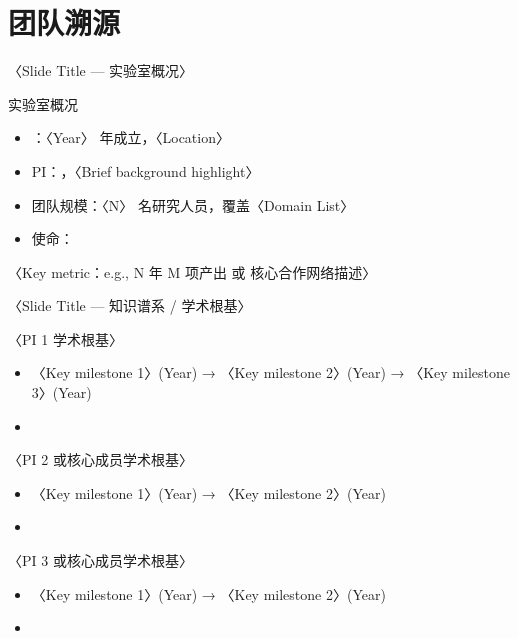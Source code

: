 
\renewcommand{\secblurb}{〈本节一句话主旨：团队从哪里来，知识谱系如何构成其独特优势〉}
\section{团队溯源}

\begin{frame}{〈Slide Title — 实验室概况〉}
  \begin{block}{实验室概况}
    \begin{itemize}
      \item {}：〈Year〉 年成立，〈Location〉
      \item PI：，〈Brief background highlight〉
      \item 团队规模：〈N〉 名研究人员，覆盖〈Domain List〉
      \item 使命：
    \end{itemize}
  \end{block}
  \tightgap
  \begin{callout}
    〈Key metric：e.g., N 年 M 项产出 或 核心合作网络描述〉
  \end{callout}
\end{frame}

\begin{frame}{〈Slide Title — 知识谱系 / 学术根基〉}
  \begin{block}{〈PI 1 学术根基〉}
    \begin{itemize}
      \item 〈Key milestone 1〉(Year) → 〈Key milestone 2〉(Year) → 〈Key milestone 3〉(Year)
      \item {}
    \end{itemize}
  \end{block}
  \tightgap
  \begin{block}{〈PI 2 或核心成员学术根基〉}
    \begin{itemize}
      \item 〈Key milestone 1〉(Year) → 〈Key milestone 2〉(Year)
      \item {}
    \end{itemize}
  \end{block}
  \tightgap
  \begin{block}{〈PI 3 或核心成员学术根基〉}
    \begin{itemize}
      \item 〈Key milestone 1〉(Year) → 〈Key milestone 2〉(Year)
      \item {}
    \end{itemize}
  \end{block}
\end{frame}

